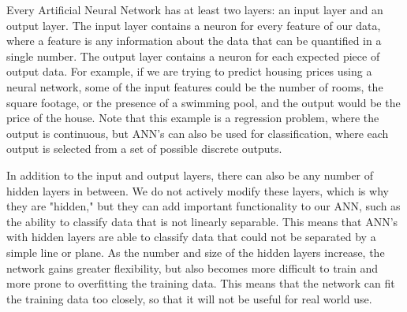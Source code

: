 \documentclass[11pt,letterpaper]{article}
\begin{document}
Every Artificial Neural Network has at least two layers: an input layer and an output layer. The input layer contains a neuron for every feature of our data, where a feature is any information about the data that can be quantified in a single number. The output layer contains a neuron for each expected piece of output data. For example, if we are trying to predict housing prices using a neural network, some of the input features could be the number of rooms, the square footage, or the presence of a swimming pool, and the output would be the price of the house. Note that this example is a regression problem, where the output is continuous, but ANN’s can also be used for classification, where each output is selected from a set of possible discrete outputs.

In addition to the input and output layers, there can also be any number of hidden layers in between. We do not actively modify these layers, which is why they are "hidden," but they can add important functionality to our ANN, such as the ability to classify data that is not linearly separable. This means that ANN's with hidden layers are able to classify data that could not be separated by a simple line or plane. As the number and size of the hidden layers increase, the network gains greater flexibility, but also becomes more difficult to train and more prone to overfitting the training data. This means that the network can fit the training data too closely, so that it will not be useful for real world use.
\end{document}
